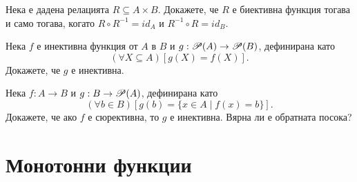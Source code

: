

\begin{problem}
  Нека е дадена релацията $R\subseteq A\times B$.
  Докажете, че $R$ е биективна функция тогава и само тогава, когато $R\circ R^{-1} = id_A$ и $R^{-1}\circ R = id_B$.
\end{problem}

\begin{problem}
  Нека $f$ е инективна функция от $A$ в $B$ и $g:\mathscr{P}(A) \rightarrow \mathscr{P}(B)$, дефинирана като 
  \[(\forall X \subseteq A)[g(X) = f(X)].\]
  Докажете, че $g$ е инективна.
\end{problem}

\begin{problem}
  Нека $f:A\rightarrow B$ и $g:B\rightarrow\mathscr{P}(A)$, дефинирана като 
  \[(\forall b \in B)[g(b) = \{x\in A\mid f(x) = b\}].\]
  Докажете, че ако $f$ е сюрективна, то $g$ е инективна.
  Вярна ли е обратната посока?
\end{problem}

\section{Монотонни функции}




